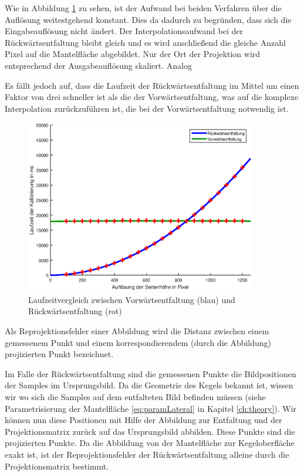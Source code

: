 Wie in Abbildung \ref{fig:runningTimeComparision} zu sehen, ist der Aufwand bei beiden Verfahren über die Auflösung weitestgehend konstant. Dies da dadurch zu begründen, dass sich die Eingabeauflösung nicht ändert. Der Interpolationsaufwand bei der Rückwärtsentfaltung bleibt gleich und es wird anschließend die gleiche Anzahl Pixel auf die Mantelfläche abgebildet. Nur der Ort der Projektion wird entsprechend der Ausgabeauflösung skaliert. Analog 

Es fällt jedoch auf, dass die Laufzeit der Rückwärtsentfaltung im Mittel um einen Faktor von drei schneller ist als die der Vorwärtsentfaltung, was auf die komplexe Interpolation zurückzuführen ist, die bei der Vorwärtsentfaltung notwendig ist. 
\begin{figure}[!htb]
	\centering
	\includegraphics[width=0.9\textwidth]{images/runningTimeCalibration.eps}
	\caption{Laufzeitvergleich zwischen Vorwärtsentfaltung (blau) und Rückwärtsentfaltung (rot)}
	\label{fig:runningTimeComparision}
\end{figure}


\bigskip

Als Reprojektionsfehler einer Abbildung wird die Distanz zwischen einem gemessenem Punkt und einem korrespondierendem (durch die Abbildung) projizierten Punkt bezeichnet. 


Im Falle der Rückwärtsentfaltung sind die gemessenen Punkte die Bildpositionen der Samples im Ursprungsbild. Da die Geometrie des Kegels bekannt ist, wissen wir wo sich die  Samples auf dem entfalteten Bild befinden müssen (siehe Parametrisierung der Mantelfläche \ref{eq:paramLateral} in Kapitel \ref{ch:theory}). Wir können nun diese Positionen mit Hilfe der Abbildung zur Entfaltung und der Projektionsmatrix zurück auf das Ursprungsbild abbilden. Diese Punkte sind die projizierten Punkte. Da die Abbildung von der Mantelfläche zur Kegeloberfläche exakt ist, ist der Reprojektionsfehler der Rückwärtsentfaltung alleine durch die Projektionsmatrix bestimmt. 

